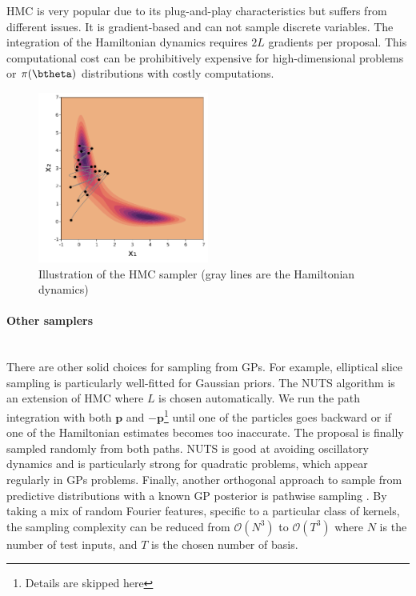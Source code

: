 \ac{HMC} is very popular due to its plug-and-play characteristics but suffers from different issues.
It is gradient-based and can not sample discrete variables.
The integration of the Hamiltonian dynamics requires $2L$ gradients per proposal.
This computational cost can be prohibitively expensive for high-dimensional problems or $\pi(\btheta)$ distributions with costly computations.

\begin{figure}[H]
    \centering
\includegraphics[width=0.5\textwidth]{./chapters/2_background/figures/hmc_sampling.pdf}
\caption{Illustration of the HMC sampler (gray lines are the Hamiltonian dynamics)}
\label{fig:hmc}
\end{figure}


\paragraph{Other samplers}\mbox{}\\
There are other solid choices for sampling from \ac{GPs}.
For example, elliptical slice sampling \citet{murray2010elliptical} is particularly well-fitted for Gaussian priors.
The \ac{NUTS} algorithm \cite{hoffman2014no} is an extension of \ac{HMC} where $L$ is chosen automatically.
We run the path integration with both $\boldsymbol{p}$ and $-\boldsymbol{p}$\footnote{Details are skipped here} until one of the particles goes backward or if one of the Hamiltonian estimates becomes too inaccurate.
The proposal is finally sampled randomly from both paths.
\ac{NUTS} is good at avoiding oscillatory dynamics and is particularly strong for quadratic problems, which appear regularly in \ac{GPs} problems.
Finally, another orthogonal approach to sample from predictive distributions with a known \ac{GP} posterior is pathwise sampling \cite{wilson2021pathwise}.
By taking a mix of random Fourier features, specific to a particular class of kernels, the sampling complexity can be reduced from $\mathcal{O}(N^3)$ to $\mathcal{O}(T^3)$ where $N$ is the number of test inputs, and $T$ is the chosen number of basis.

